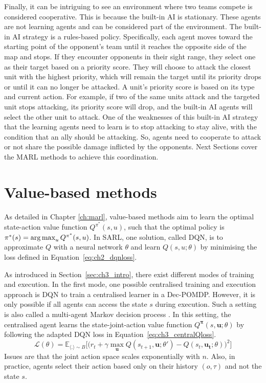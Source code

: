 Finally, it can be intriguing to see an environment where two teams compete is considered cooperative.
This is because the built-in AI is stationary. 
These agents are not learning agents and can be considered part of the environment.
The built-in AI strategy is a rules-based policy.
Specifically, each agent moves toward the starting point of the opponent's team until it reaches the opposite side of the map and stops.
If they encounter opponents in their sight range, they select one as their target based on a priority score.
They will choose to attack the closest unit with the highest priority, which will remain the target until its priority drops or until it can no longer be attacked.
A unit's priority score is based on its type and current action.
For example, if two of the same units attack and the targeted unit stops attacking, its priority score will drop, and the built-in AI agents will select the other unit to attack.
One of the weaknesses of this built-in AI strategy that the learning agents need to learn is to stop attacking to stay alive, with the condition that an ally should be attacking.
So, agents need to cooperate to attack or not share the possible damage inflicted by the opponents.
Next Sections cover the MARL methods to achieve this coordination.

\section{Value-based methods}
\label{sec:ch3_value}


As detailed in Chapter \ref{ch:marl}, value-based methods aim to learn the optimal state-action value function $Q^{\pi^*}(s, u)$, such that the optimal policy is $\pi^*(s)=\operatorname*{arg\,max}_{u} Q^{\pi^*}(s, u)$.
In SARL, one solution, called DQN, is to approximate $Q$ with a neural network $\theta$ and learn $Q(s, u;\theta)$
by minimising the loss defined in Equation~\ref{eq:ch2_dqnloss}.

As introduced in Section~\ref{sec:ch3_intro}, there exist different modes of training and execution.
In the first mode, one possible centralised training and execution approach is DQN to train a centralised learner in a Dec-POMDP.
However, it is only possible if all agents can access the state $s$ during execution.
Such a setting is also called a multi-agent Markov decision process \citep{boutilier1996planning}.
In this setting, the centralised agent learns the state-joint-action value function $Q^{\boldsymbol{\pi}}(s,\mathbf{u}; \theta)$ by following the adapted DQN loss in Equation~\ref{eq:ch3_centralQloss}.
\begin{equation}
\label{eq:ch3_centralQloss}
    \mathcal{L}(\theta) = \mathbb{E}_{\langle . \rangle\sim B} \big[\big(r_{t} + \gamma \max_{\mathbf{u}} Q(s_{t+1}, \mathbf{u}; \theta')- Q(s_{t}, \mathbf{\mathbf{u_t}}; \theta)\big)^{2}\big]
\end{equation}
Issues are that the joint action space scales exponentially with $n$.
Also, in practice, agents select their action based only on their history $(o, \tau)$ and not the state $s$.


